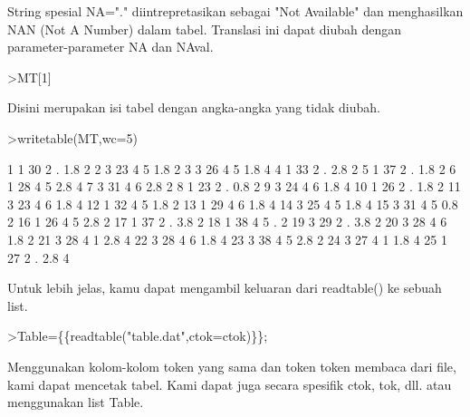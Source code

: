 \documentclass[a4paper,10pt]{article}
\begin{document}
\begin{eulernotebook}
\begin{eulercomment}
String spesial NA="." diintrepretasikan sebagai "Not Available" dan menghasilkan NAN (Not
A Number) dalam tabel. Translasi ini dapat diubah dengan parameter-parameter NA dan NAval.
\end{eulercomment}
\begin{eulerprompt}
>MT[1]
\end{eulerprompt}
\begin{euleroutput}
  [1,  1,  30,  2,  NAN,  1.8,  2]
\end{euleroutput}
\begin{eulercomment}
Disini merupakan isi tabel dengan angka-angka yang tidak diubah.
\end{eulercomment}
\begin{eulerprompt}
>writetable(MT,wc=5)
\end{eulerprompt}
\begin{euleroutput}
      1    1   30    2    .  1.8    2
      2    3   23    4    5  1.8    2
      3    3   26    4    5  1.8    4
      4    1   33    2    .  2.8    2
      5    1   37    2    .  1.8    2
      6    1   28    4    5  2.8    4
      7    3   31    4    6  2.8    2
      8    1   23    2    .  0.8    2
      9    3   24    4    6  1.8    4
     10    1   26    2    .  1.8    2
     11    3   23    4    6  1.8    4
     12    1   32    4    5  1.8    2
     13    1   29    4    6  1.8    4
     14    3   25    4    5  1.8    4
     15    3   31    4    5  0.8    2
     16    1   26    4    5  2.8    2
     17    1   37    2    .  3.8    2
     18    1   38    4    5    .    2
     19    3   29    2    .  3.8    2
     20    3   28    4    6  1.8    2
     21    3   28    4    1  2.8    4
     22    3   28    4    6  1.8    4
     23    3   38    4    5  2.8    2
     24    3   27    4    1  1.8    4
     25    1   27    2    .  2.8    4
\end{euleroutput}
\begin{eulercomment}
Untuk lebih jelas, kamu dapat mengambil keluaran dari readtable() ke sebuah list.
\end{eulercomment}
\begin{eulerprompt}
>Table=\{\{readtable("table.dat",ctok=ctok)\}\};
\end{eulerprompt}
\begin{eulercomment}
Menggunakan kolom-kolom token yang sama dan token token membaca dari file, kami dapat
mencetak tabel. Kami dapat juga secara spesifik ctok, tok, dll. atau menggunakan list
Table.
\end{eulercomment}
\begin{eulerprompt}

\end{eulerprompt}
\end{eulernotebook}
\end{document}
